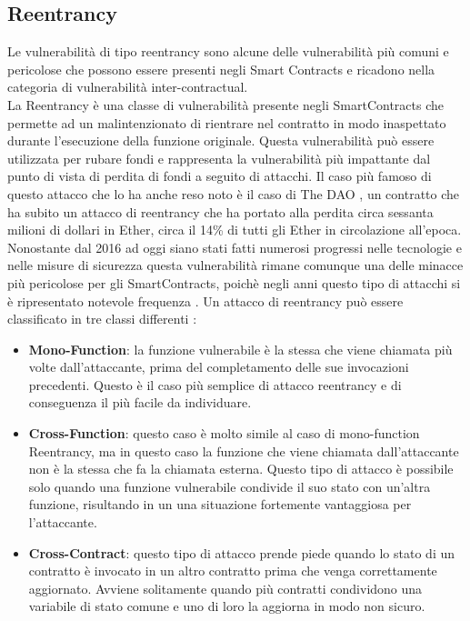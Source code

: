 \documentclass[../../Thesis.tex]{subfiles}
\begin{document}
\subsection{Reentrancy}
Le vulnerabilit\`a di tipo reentrancy sono alcune delle vulnerabilit\`a pi\`u comuni e pericolose che possono essere presenti negli Smart Contracts e ricadono nella categoria di vulnerabilit\`a inter-contractual.\\
La Reentrancy \`e una classe di vulnerabilit\`a presente negli SmartContracts che permette ad un malintenzionato di rientrare nel contratto in modo inaspettato durante l'esecuzione della funzione originale. Questa vulnerabilit\`a pu\`o essere utilizzata per rubare fondi e rappresenta la vulnerabilit\`a pi\`u impattante dal punto di vista di perdita di fondi a seguito di attacchi.
Il caso pi\`u famoso di questo attacco che lo ha anche reso noto \`e il caso di The DAO \cite{DAO}, un contratto che ha subito un attacco di reentrancy che ha portato alla perdita circa sessanta milioni di dollari in Ether, circa il 14\% di tutti gli Ether in circolazione all'epoca. Nonostante dal 2016 ad oggi siano stati fatti numerosi progressi nelle tecnologie e nelle misure di sicurezza questa vulnerabilit\`a rimane comunque una delle minacce pi\`u pericolose per gli SmartContracts, poich\`e negli anni questo tipo di attacchi si \`e ripresentato notevole frequenza \cite{reentrancy-historical}. Un attacco di reentrancy pu\`o essere classificato in tre classi differenti \cite{Zeus, Vulnerabilities}:
\begin{itemize}
    \item \textbf{Mono-Function}: la funzione vulnerabile \`e la stessa che viene chiamata pi\`u volte dall'attaccante, prima del completamento delle sue invocazioni precedenti. Questo \`e il caso pi\`u semplice di attacco reentrancy e di conseguenza il pi\`u facile da individuare.
    \item \textbf{Cross-Function}: questo caso \`e molto simile al caso di mono-function Reentrancy, ma in questo caso la funzione che viene chiamata dall'attaccante non \`e la stessa che fa la chiamata esterna. Questo tipo di attacco \`e possibile solo quando una funzione vulnerabile condivide il suo stato con un'altra funzione, risultando in un una situazione fortemente vantaggiosa per l'attaccante. 
    \item \textbf{Cross-Contract}: questo tipo di attacco prende piede quando lo stato di un contratto \`e invocato in un altro contratto prima che venga correttamente aggiornato. Avviene solitamente quando pi\`u contratti condividono una variabile di stato comune e uno di loro la aggiorna in modo non sicuro. 
\end{itemize}
\end{document}
